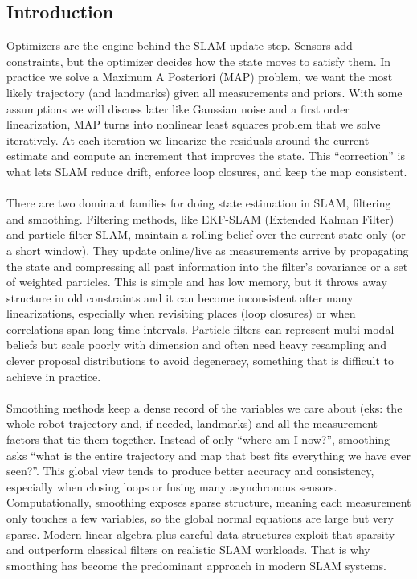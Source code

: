 \subsection{Introduction}
Optimizers are the engine behind the \gls{SLAM} update step. Sensors add constraints, but the optimizer decides how the state moves to satisfy them. In practice we solve a Maximum A Posteriori (\gls{MAP}) problem, we want the most likely trajectory (and landmarks) given all measurements and priors. With some assumptions we will discuss later like Gaussian noise and a first order linearization, \gls{MAP} turns into nonlinear least squares problem that we solve iteratively. At each iteration we linearize the residuals around the current estimate and compute an increment that improves the state. This ``correction'' is what lets \gls{SLAM} reduce drift, enforce loop closures, and keep the map consistent. \cite{SLAM_part_present_future}
\\ \\
There are two dominant families for doing state estimation in \gls{SLAM}, filtering and smoothing. Filtering methods, like \gls{EKF}-\gls{SLAM} (Extended Kalman Filter) and particle-filter \gls{SLAM}, maintain a rolling belief over the current state only (or a short window). They update online/live as measurements arrive by propagating the state and compressing all past information into the filter's covariance or a set of weighted particles. This is simple and has low memory, but it throws away structure in old constraints and it can become inconsistent after many linearizations, especially when revisiting places (loop closures) or when correlations span long time intervals. Particle filters can represent multi modal beliefs but scale poorly with dimension and often need heavy resampling and clever proposal distributions to avoid degeneracy, something that is difficult to achieve in practice. \cite{SLAM_tutorial_part_1}\cite{SLAM_tutorial_part_2}
\\ \\
Smoothing methods keep a dense record of the variables we care about (eks: the whole robot trajectory and, if needed, landmarks) and all the measurement factors that tie them together. Instead of only ``where am I now?'', smoothing asks ``what is the entire trajectory and map that best fits everything we have ever seen?''. This global view tends to produce better accuracy and consistency, especially when closing loops or fusing many asynchronous sensors. Computationally, smoothing exposes sparse structure, meaning each measurement only touches a few variables, so the global normal equations are large but very sparse. Modern linear algebra plus careful data structures exploit that sparsity and outperform classical filters on realistic \gls{SLAM} workloads. That is why smoothing has become the predominant approach in modern \gls{SLAM} systems.
